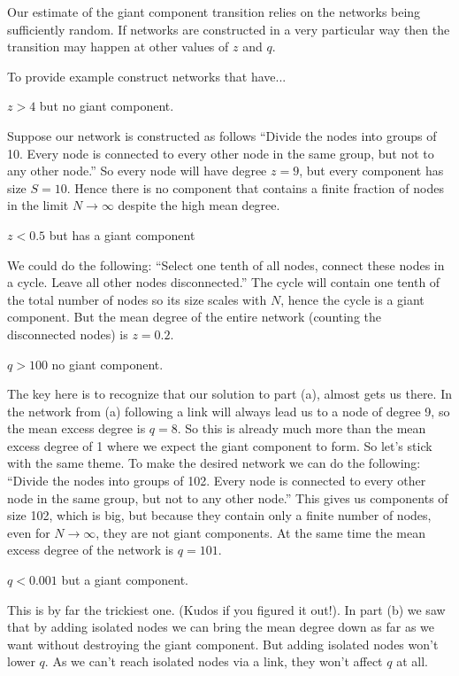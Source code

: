 Our estimate of the giant component transition relies on the networks being sufficiently random. If networks are constructed in a very particular way then the transition may happen at other values of $z$ and $q$. 

To provide example construct networks that have...

\subquestion $z>4$ but no giant component.

\solution 
Suppose our network is constructed as follows ``Divide the nodes into groups of 10. Every node is connected to every other node in the same group, but not to any other node.'' So every node will have degree $z=9$, but every component has size $S=10$. Hence there is no component that contains a finite fraction of nodes in the limit $N\to \infty$ despite the high mean degree.

\subquestion $z<0.5$ but has a giant component

\solution
We could do the following: ``Select one tenth of all nodes, connect these nodes in a cycle. Leave all other nodes disconnected.'' The cycle will contain one tenth of the total number of nodes so its size scales with $N$, hence the cycle is a giant component. But the mean degree of the entire network (counting the disconnected nodes) is $z=0.2$.

\subquestion
$q>100$ no giant component. 

\solution
The key here is to recognize that our solution to part (a), almost gets us there. In the network from (a) following a link will always lead us to a node of degree 9, so the mean excess degree is $q=8$. So this is already much more than the mean excess degree of 1 where we expect the giant component to form. So let's stick with the same theme. To make the desired network we can do the following: 
``Divide the nodes into groups of 102. Every node is connected to every other node in the same group, but not to any other node.''
This gives us components of size 102, which is big, but because they contain only a finite number of nodes, even for $N\to \infty$, they are not giant components. At the same time the mean excess degree of the network is $q=101$. 

\subquestion $q<0.001$ but a giant component.

\solution This is by far the trickiest one. (Kudos if you figured it out!). In part (b) we saw that by adding isolated nodes we can bring the mean degree down as far as we want without destroying the giant component. But adding isolated nodes won't lower $q$. As we can't reach isolated nodes via a link, they won't affect $q$ at all. 


